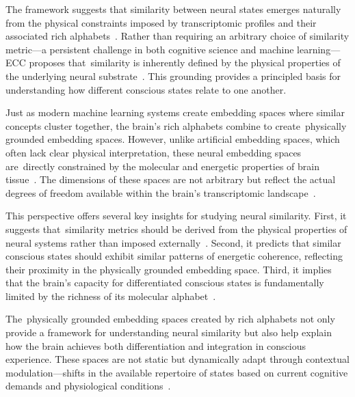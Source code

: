The framework suggests that similarity between neural states emerges naturally from the physical constraints imposed by transcriptomic profiles and their associated rich alphabets~\cite{siletti2023transcriptomic}. Rather than requiring an arbitrary choice of similarity metric—a persistent challenge in both cognitive science and machine learning—ECC proposes that~similarity is inherently defined by the physical properties of the underlying neural substrate~\cite{zhang2023adaptive}. This grounding provides a principled basis for understanding how different conscious states relate to one another.

Just as modern machine learning systems create embedding spaces where similar concepts cluster together, the brain's rich alphabets combine to create~physically grounded embedding spaces. However, unlike artificial embedding spaces, which often lack clear physical interpretation, these neural embedding spaces are~directly constrained by the molecular and energetic properties of brain tissue~\cite{bakken2021comparative}. The dimensions of these spaces are not arbitrary but reflect the actual degrees of freedom available within the brain's transcriptomic landscape~\cite{cembrowski2018continuous}.

This perspective offers several key insights for studying neural similarity. First, it suggests that~similarity metrics should be derived from the physical properties of neural systems rather than imposed externally~\cite{attwell2001}. Second, it predicts that similar conscious states should exhibit similar patterns of energetic coherence, reflecting their proximity in the physically grounded embedding space. Third, it implies that the brain's capacity for differentiated conscious states is fundamentally limited by the richness of its molecular alphabet~\cite{laughlin2001}.

The~physically grounded embedding spaces created by rich alphabets not only provide a framework for understanding neural similarity but also help explain how the brain achieves both differentiation and integration in conscious experience. These spaces are not static but dynamically adapt through contextual modulation—shifts in the available repertoire of states based on current cognitive demands and physiological conditions~\cite{freeman2007}.

